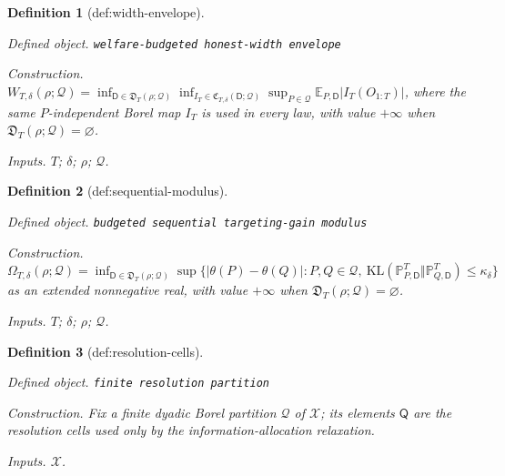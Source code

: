 \documentclass{article}
\newtheorem{definition}{Definition}
\begin{document}
\begin{definition}[def:width-envelope]\label{def:width-envelope}
\par\smallskip\noindent\emph{Defined object.} \texttt{welfare-\allowbreak{}budgeted honest-\allowbreak{}width envelope}
\par\smallskip\noindent\emph{Construction.} \(W_{T,\delta}(\rho;\mathcal Q)=\inf_{\mathsf D\in\mathfrak D_T(\rho;\mathcal Q)}\inf_{I_T\in\mathfrak C_{T,\delta}(\mathsf D;\mathcal Q)}\sup_{P\in\mathcal Q}\mathbb E_{P,\mathsf D}|I_T(O_{1:T})|\), where the same \(P\)-independent Borel map \(I_T\) is used in every law, with value \(+\infty\) when \(\mathfrak D_T(\rho;\mathcal Q)=\varnothing\).
\par\smallskip\noindent\emph{Inputs.} \(T\); \(\delta\); \(\rho\); \(\mathcal Q\).
\end{definition}

\begin{definition}[def:sequential-modulus]\label{def:sequential-modulus}
\par\smallskip\noindent\emph{Defined object.} \texttt{budgeted sequential targeting-\allowbreak{}gain modulus}
\par\smallskip\noindent\emph{Construction.} \(\Omega_{T,\delta}(\rho;\mathcal Q)=\inf_{\mathsf D\in\mathfrak D_T(\rho;\mathcal Q)}\sup\{|\theta(P)-\theta(Q)|:P,Q\in\mathcal Q,\ \mathrm{KL}(\mathbb P_{P,\mathsf D}^{T}\Vert\mathbb P_{Q,\mathsf D}^{T})\le\kappa_\delta\}\) as an extended nonnegative real, with value \(+\infty\) when \(\mathfrak D_T(\rho;\mathcal Q)=\varnothing\).
\par\smallskip\noindent\emph{Inputs.} \(T\); \(\delta\); \(\rho\); \(\mathcal Q\).
\end{definition}

\begin{definition}[def:resolution-cells]\label{def:resolution-cells}
\par\smallskip\noindent\emph{Defined object.} \texttt{finite resolution partition}
\par\smallskip\noindent\emph{Construction.} Fix a finite dyadic Borel partition \(\mathscr Q\) of \(\mathcal X\); its elements \(\mathsf Q\) are the resolution cells used only by the information-allocation relaxation.
\par\smallskip\noindent\emph{Inputs.} \(\mathcal X\).
\end{definition}
\end{document}
